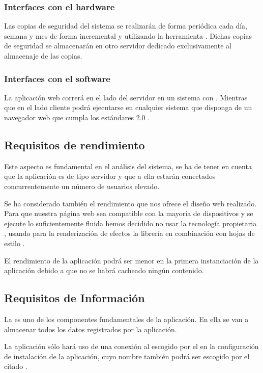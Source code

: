 \subsubsection{Interfaces con el hardware}
Las copias de seguridad del sistema se realizarán de forma periódica cada día,
semana y mes de forma incremental y utilizando la herramienta
. Dichas copias de seguridad se almacenarán en otro servidor
dedicado exclusivamente al almacenaje de las copias.

\subsubsection{Interfaces con el software}
La aplicación web correrá en el lado del servidor en un sistema  con . Mientras que en el lado cliente podrá ejecutarse en cualquier
sistema que disponga de un navegador web que cumpla los estándares 2.0 .

\subsection{Requisitos de rendimiento}
Este aspecto es fundamental en el análisis del sistema, se ha de tener en cuenta
que la aplicación es de tipo servidor y que a ella estarán conectados
concurrentemente un número de usuarios elevado.

Se ha considerado también el rendimiento que nos ofrece el diseño web
realizado. Para que nuestra página web sea compatible con la mayoría de
dispositivos y se ejecute lo suficientemente fluida hemos decidido no usar la
tecnología propietaria , usando para la renderización de efectos
la librería  en combinación con hojas de estilo .

El rendimiento de la aplicación podrá ser menor en la primera instanciación de
la aplicación debido a que no se habrá cacheado ningún contenido.

\subsection{Requisitos de Información}
La  es uno de los componentes fundamentales de la
aplicación. En ella se van a almacenar todos los datos registrados por la
aplicación.

La aplicación sólo hará uso de una conexión al  escogido por el
 en la configuración de instalación de la aplicación, cuyo
nombre también podrá ser escogido por el citado .

